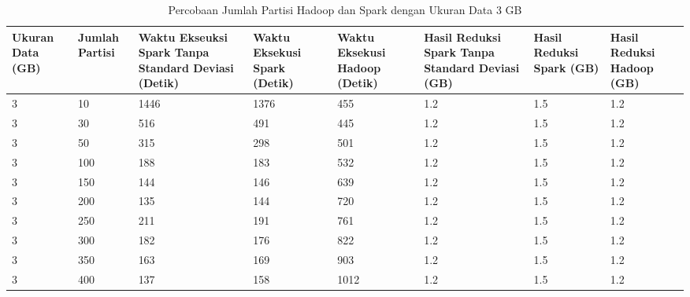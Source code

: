 \begin{table}[H] 
	\centering 
	\caption{Percobaan Jumlah Partisi Hadoop dan Spark dengan Ukuran Data 3 GB}
	\label{tab:spark3}
	\begin{tabular}{|p{1cm}|p{1cm}|p{2cm}|p{2cm}|p{2cm}|p{2cm}|p{2cm}|p{2cm}|}
\hline
Ukuran Data (GB) & Jumlah Partisi &  Waktu Ekseuksi Spark Tanpa Standard Deviasi (Detik) & Waktu Eksekusi Spark (Detik) & Waktu Eksekusi Hadoop (Detik) & Hasil Reduksi Spark Tanpa Standard Deviasi (GB) & Hasil Reduksi Spark (GB)  & Hasil Reduksi Hadoop (GB)\\ 
\hline
3 & 10 & 1446 & 1376 & 455 & 1.2 & 1.5 & 1.2 \\
\hline
3 & 30 & 516 & 491 & 445 & 1.2 & 1.5 & 1.2 \\
\hline
3 & 50 & 315 & 298 & 501 & 1.2 & 1.5 & 1.2 \\
\hline
3 & 100 & 188 & 183 & 532 & 1.2 & 1.5 & 1.2 \\
\hline
3 & 150 & 144 & 146 & 639 & 1.2 & 1.5 & 1.2 \\
\hline
3 & 200 & 135 & 144 & 720 & 1.2 & 1.5 & 1.2 \\
\hline
3 & 250 & 211 & 191 & 761 & 1.2 & 1.5 & 1.2 \\
\hline
3 & 300 & 182 & 176 & 822 & 1.2 & 1.5 & 1.2 \\
\hline
3 & 350 & 163 & 169 & 903 & 1.2 & 1.5 & 1.2 \\
\hline
3 & 400 & 137 & 158 & 1012 & 1.2 & 1.5 & 1.2 \\
\hline


\hline

	\end{tabular} 
\end{table}



\def\scl{1}

\def\leg{} 
\def\std{none}
\def\ymin{}
\def\ymax{}

